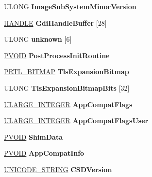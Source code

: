 \begin{DoxyCompactItemize}
U\+L\+O\+NG {\bfseries Image\+Sub\+System\+Minor\+Version}
\item 
\mbox{\label{struct___p_e_b_afbe6d22873011aac8661a69fc33618da}} 
\hyperlink{interfacevoid}{H\+A\+N\+D\+LE} {\bfseries Gdi\+Handle\+Buffer} \mbox{[}28\mbox{]}
\item 
\mbox{\label{struct___p_e_b_a338b49f0c79221ed585e1e4583de6e1e}} 
U\+L\+O\+NG {\bfseries unknown} \mbox{[}6\mbox{]}
\item 
\mbox{\label{struct___p_e_b_a6216f598cb94fdb22534ef3b72dc2d02}} 
\hyperlink{interfacevoid}{P\+V\+O\+ID} {\bfseries Post\+Process\+Init\+Routine}
\item 
\mbox{\label{struct___p_e_b_ae8f830899d9eee004f3919bbfa40a191}} 
\hyperlink{struct___r_t_l___b_i_t_m_a_p}{P\+R\+T\+L\+\_\+\+B\+I\+T\+M\+AP} {\bfseries Tls\+Expansion\+Bitmap}
\item 
\mbox{\label{struct___p_e_b_ab8c4978a1b8834ce1266f96e1ee938c0}} 
U\+L\+O\+NG {\bfseries Tls\+Expansion\+Bitmap\+Bits} \mbox{[}32\mbox{]}
\item 
\mbox{\label{struct___p_e_b_ab8c12872564aacca9d91d84af71dbfe1}} 
\hyperlink{struct___u_l_a_r_g_e___i_n_t_e_g_e_r}{U\+L\+A\+R\+G\+E\+\_\+\+I\+N\+T\+E\+G\+ER} {\bfseries App\+Compat\+Flags}
\item 
\mbox{\label{struct___p_e_b_a9f36c1b0daf68e96afdd783047b3a682}} 
\hyperlink{struct___u_l_a_r_g_e___i_n_t_e_g_e_r}{U\+L\+A\+R\+G\+E\+\_\+\+I\+N\+T\+E\+G\+ER} {\bfseries App\+Compat\+Flags\+User}
\item 
\mbox{\label{struct___p_e_b_a53c03c7b34261f96f56cd5ff9c675854}} 
\hyperlink{interfacevoid}{P\+V\+O\+ID} {\bfseries Shim\+Data}
\item 
\mbox{\label{struct___p_e_b_ad752584996328817ba2e492d695f3bf7}} 
\hyperlink{interfacevoid}{P\+V\+O\+ID} {\bfseries App\+Compat\+Info}
\item 
\mbox{\label{struct___p_e_b_a0727bf882c6b5a507ae8544ebaf80b91}} 
\hyperlink{struct___u_n_i_c_o_d_e___s_t_r_i_n_g}{U\+N\+I\+C\+O\+D\+E\+\_\+\+S\+T\+R\+I\+NG} {\bfseries C\+S\+D\+Version}

\end{DoxyCompactItemize}
